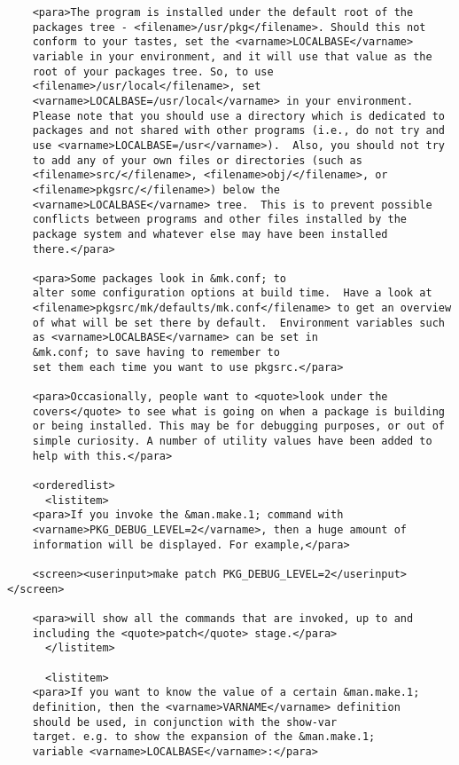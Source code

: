 \begin{verbatim}
    <para>The program is installed under the default root of the
    packages tree - <filename>/usr/pkg</filename>. Should this not
    conform to your tastes, set the <varname>LOCALBASE</varname>
    variable in your environment, and it will use that value as the
    root of your packages tree. So, to use
    <filename>/usr/local</filename>, set
    <varname>LOCALBASE=/usr/local</varname> in your environment.
    Please note that you should use a directory which is dedicated to
    packages and not shared with other programs (i.e., do not try and
    use <varname>LOCALBASE=/usr</varname>).  Also, you should not try
    to add any of your own files or directories (such as
    <filename>src/</filename>, <filename>obj/</filename>, or
    <filename>pkgsrc/</filename>) below the
    <varname>LOCALBASE</varname> tree.  This is to prevent possible
    conflicts between programs and other files installed by the
    package system and whatever else may have been installed
    there.</para>

    <para>Some packages look in &mk.conf; to
    alter some configuration options at build time.  Have a look at
    <filename>pkgsrc/mk/defaults/mk.conf</filename> to get an overview
    of what will be set there by default.  Environment variables such
    as <varname>LOCALBASE</varname> can be set in
    &mk.conf; to save having to remember to
    set them each time you want to use pkgsrc.</para>

    <para>Occasionally, people want to <quote>look under the
    covers</quote> to see what is going on when a package is building
    or being installed. This may be for debugging purposes, or out of
    simple curiosity. A number of utility values have been added to
    help with this.</para>

    <orderedlist>
      <listitem>
	<para>If you invoke the &man.make.1; command with
	<varname>PKG_DEBUG_LEVEL=2</varname>, then a huge amount of
	information will be displayed. For example,</para>

	<screen><userinput>make patch PKG_DEBUG_LEVEL=2</userinput></screen>

	<para>will show all the commands that are invoked, up to and
	including the <quote>patch</quote> stage.</para>
      </listitem>

      <listitem>
	<para>If you want to know the value of a certain &man.make.1;
	definition, then the <varname>VARNAME</varname> definition
	should be used, in conjunction with the show-var
	target. e.g. to show the expansion of the &man.make.1;
	variable <varname>LOCALBASE</varname>:</para>


\end{verbatim}
